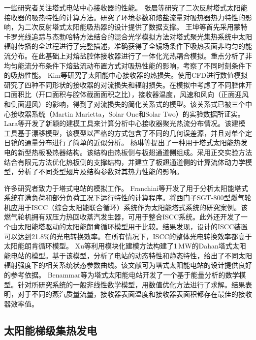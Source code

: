一些研究者关注塔式电站中心接收器的性能。
张晨等\cite{Zhang2015}研究了二次反射塔式太阳能接收器的吸热特性的计算方法。研究了环境参数和熔盐流量对吸热器热力特性的影响，为二次反射塔式太阳能吸热器的设计提供了数据支撑。
王坤等\cite{Wang2016a}首先采用蒙特卡罗光线追踪与杰勃哈特方法结合的混合光学模拟方法对塔式聚光集热系统中太阳辐射传播的全过程进行了完整描述，准确获得了全镜场条件下吸热表面非均匀的能流分布。在此基础上对熔盐腔体接收器进行了一体化光热耦合模拟。重点分析了非均匀能流分布条件下熔盐流动布置方式对吸热性能的影响，考察了不同时刻条件下的吸热性能。
Kim等\cite{Kim2015}研究了太阳能中心接收器的热损失。使用CFD进行数值模拟研究了四种不同形状的接收器的对流损失和辐射损失。在模拟中考虑了不同腔体开口面积比（开口面积与腔体截面面积之比），接收器温度，风速和风向（正面迎风和侧面迎风）的影响，得到了对流损失的简化关系式的模型。该关系式已被三个中心接收器系统（Martin Marietta，Solar One和Solar Two）的实验数据所证实。
Lara等\cite{Lara2016}开发了新颖的建模工具来计算分析中心接收器聚光热流分布情况。该建模工具基于漂移模型，该模型以严格的方式包含了不同的几何误差源，并且对单个定日镜的通量分布进行了简单的近似分析。
杨琳等\cite{Yang2015}提出了一种用于塔式太阳能热发电的新型热板吸热器结构。该结构由热板侧与板翅通道侧组成。采用正交实验方法结合有限元方法优化热板侧的支撑结构，并建立了板翅通道侧的计算流体动力学模型，分析了不同类型翅片及结构参数对其热力性能的影响。

许多研究者致力于塔式电站的模拟工作。
Franchini等\cite{Franchini2013}开发了用于分析太阳能塔式系统在满负荷和部分负荷工况下运行特性的计算程序。将西门子SGT-800型燃气轮机应用于ISCC（综合太阳能联合循环）系统作为太阳能塔式系统的研究案例。该燃气轮机拥有双压力热回收蒸汽发生器，可用于整合ISCC系统。此外还开发了一个由太阳能塔驱动的太阳能朗肯循环模型用于比较。结果发现，设计的ISCC装置可以达到21.8\%的光电转换效率。在所有情况下，ISCC的整体光电转换效率都高于太阳能朗肯循环模型。
Xu等\cite{Xu2011a,Xu2012}利用模块化建模方法构建了1$\,\mathrm{MW}$的Dahan塔式太阳能电站的模型。基于该模型，分析了电站的动态特性和静态特性，给出了不同太阳辐射强度下的相关系统状态参数曲线。该文献可为塔式太阳能电站的设计提供良好的参考依据。
Benammar等\cite{Benammar2014}为塔式太阳能电站开发了一个基于能量分析的数学模型。针对所研究系统的一般非线性数学模型，用数值优化方法进行了求解。结果表明，对于不同的蒸汽质量流量，接收器表面温度和接收器表面积都存在最佳的接收器效率值。

\subsection{太阳能梯级集热发电}
\label{sec:cs}

